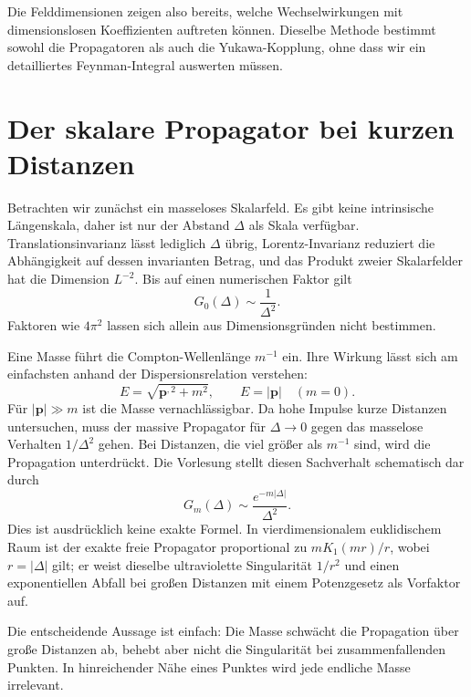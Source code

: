 Die Felddimensionen zeigen also bereits, welche Wechselwirkungen mit dimensionslosen Koeffizienten auftreten können. Dieselbe Methode bestimmt sowohl die Propagatoren als auch die Yukawa-Kopplung, ohne dass wir ein detailliertes Feynman-Integral auswerten müssen.

\section{Der skalare Propagator bei kurzen Distanzen}

Betrachten wir zunächst ein masseloses Skalarfeld. Es gibt keine intrinsische Längenskala, daher ist nur der Abstand \(\Delta\) als Skala verfügbar. Translationsinvarianz lässt lediglich \(\Delta\) übrig, Lorentz-Invarianz reduziert die Abhängigkeit auf dessen invarianten Betrag, und das Produkt zweier Skalarfelder hat die Dimension \(L^{-2}\). Bis auf einen numerischen Faktor gilt
\begin{equation}
G_0(\Delta)\sim\frac{1}{\Delta^2}.
\end{equation}
Faktoren wie \(4\pi^2\) lassen sich allein aus Dimensionsgründen nicht bestimmen.

Eine Masse führt die Compton-Wellenlänge \(m^{-1}\) ein. Ihre Wirkung lässt sich am einfachsten anhand der Dispersionsrelation verstehen:
\begin{equation}
E=\sqrt{\bm p^{,2}+m^2},
\qquad
E=|\bm p|\quad(m=0).
\end{equation}
Für \(|\bm p|\gg m\) ist die Masse vernachlässigbar. Da hohe Impulse kurze Distanzen untersuchen, muss der massive Propagator für \(\Delta\to0\) gegen das masselose Verhalten \(1/\Delta^2\) gehen. Bei Distanzen, die viel größer als \(m^{-1}\) sind, wird die Propagation unterdrückt. Die Vorlesung stellt diesen Sachverhalt schematisch dar durch
\begin{equation}
G_m(\Delta)\sim \frac{e^{-m|\Delta|}}{\Delta^2}.
\end{equation}
Dies ist ausdrücklich keine exakte Formel. In vierdimensionalem euklidischem Raum ist der exakte freie Propagator proportional zu \(mK_1(mr)/r\), wobei \(r=|\Delta|\) gilt; er weist dieselbe ultraviolette Singularität \(1/r^2\) und einen exponentiellen Abfall bei großen Distanzen mit einem Potenzgesetz als Vorfaktor auf.

Die entscheidende Aussage ist einfach: Die Masse schwächt die Propagation über große Distanzen ab, behebt aber nicht die Singularität bei zusammenfallenden Punkten. In hinreichender Nähe eines Punktes wird jede endliche Masse irrelevant.

